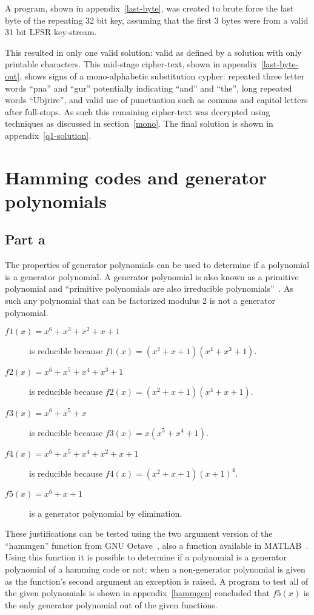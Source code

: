 \documentclass[pdftex, 12pt, a4paper]{article}
\begin{document}
A program, shown in appendix~\ref{last-byte}, was created to brute force the last byte of the repeating 32 bit key, assuming that the first 3 bytes were from a valid 31 bit LFSR key-stream.

This resulted in only one valid solution: valid as defined by a solution with only printable characters.  This mid-stage cipher-text, shown in appendix~\ref{last-byte-out}, shows signs of a mono-alphabetic substitution cypher: repeated three letter words ``pna'' and ``gur'' potentially indicating ``and'' and ``the'', long repeated words ``Ubjrire'', and valid use of punctuation such as commas and capitol letters after full-stops. As such this remaining cipher-text was decrypted using techniques as discussed in section~\ref{mono}.  The final solution is shown in appendix~\ref{q1-solution}.

\section{Hamming codes and generator polynomials}
\subsection{Part a}
The properties of generator polynomials can be used to determine if a polynomial is a generator polynomial.  A generator polynomial is also known as a primitive polynomial and ``primitive polynomials are also irreducible polynomials''~\cite{wolfram-primative}.  As such any polynomial that can be factorized modulus 2 is not a generator polynomial.

\begin{description}
    \item[$f1(x) = x^6 + x^3 + x^2 + x + 1$] is reducible because $f1(x) = (x^2+x+1)(x^4+x^3+1)$.
    \item[$f2(x) = x^6 + x^5 + x^4 + x^3 + 1$] is reducible because $f2(x) = (x^2+x+1)(x^4+x+1)$.
    \item[$f3(x) = x^6 + x^5 + x$] is reducible because $f3(x) = x(x^5 + x^4 + 1)$.
    \item[$f4(x) = x^6 + x^5 +x^4 + x^2 +x + 1$] is reducible because $f4(x) = (x^2+x+1)(x+1)^4$.
    \item[$f5(x) = x^6 + x + 1$] is a generator polynomial by elimination.
\end{description}

These justifications can be tested using the two argument version of the ``hammgen'' function from GNU Octave~\cite{hammgen-octave}, also a function available in MATLAB~\cite{hammgen-matlab}. Using this function it is possible to determine if a polynomial is a generator polynomial of a hamming code or not: when a non-generator polynomial is given as the function's second argument an exception is raised.  A program to test all of the given polynomials is shown in appendix~\ref{hammgen} concluded that $f5(x)$ is the only generator polynomial out of the given functions.
\end{document}
